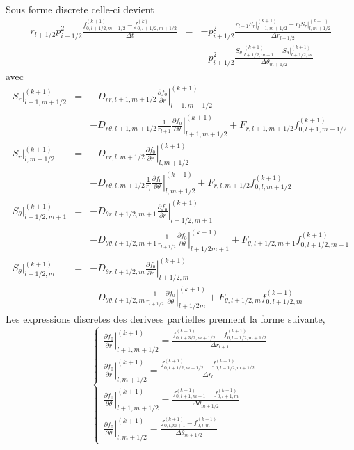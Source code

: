 Sous forme discrete celle-ci devient \begin{eqnarray*}
r_{l+1/2}p_{i+1/2}^{2}\frac{f_{0,l+1/2,m+1/2}^{(k+1)}-f_{0,l+1/2,m+1/2}^{(k)}}{\Delta t} & = & -p_{i+1/2}^{2}\frac{r_{l+1}\left.S_{r}\right|_{l+1,m+1/2}^{(k+1)}-r_{l}\left.S_{r}\right|_{l,m+1/2}^{(k+1)}}{\Delta r_{l+1/2}}\\
 &  & -p_{i+1/2}^{2}\frac{\left.S_{\theta}\right|_{l+1/2,m+1}^{(k+1)}-\left.S_{\theta}\right|_{l+1/2,m}^{(k+1)}}{\Delta\theta_{m+1/2}}\end{eqnarray*}
 avec \begin{eqnarray*}
\left.S_{r}\right|_{l+1,m+1/2}^{(k+1)} & = & -D_{rr,l+1,m+1/2}\left.\frac{\partial f_{0}}{\partial r}\right|_{l+1,m+1/2}^{(k+1)}\\
 &  & -D_{r\theta,l+1,m+1/2}\frac{1}{r_{l+1}}\left.\frac{\partial f_{0}}{\partial\theta}\right|_{l+1,m+1/2}^{(k+1)}+F_{r,l+1,m+1/2}f_{0,l+1,m+1/2}^{(k+1)}\\
\left.S_{r}\right|_{l,m+1/2}^{(k+1)} & = & -D_{rr,l,m+1/2}\left.\frac{\partial f_{0}}{\partial r}\right|_{l,m+1/2}^{(k+1)}\\
 &  & -D_{r\theta,l,m+1/2}\frac{1}{r_{l}}\left.\frac{\partial f_{0}}{\partial\theta}\right|_{l,m+1/2}^{(k+1)}+F_{r,l,m+1/2}f_{0,l,m+1/2}^{(k+1)}\\
\left.S_{\theta}\right|_{l+1/2,m+1}^{(k+1)} & = & -D_{\theta r,l+1/2,m+1}\left.\frac{\partial f_{0}}{\partial r}\right|_{l+1/2,m+1}^{(k+1)}\\
 &  & -D_{\theta\theta,l+1/2,m+1}\frac{1}{r_{l+1/2}}\left.\frac{\partial f_{0}}{\partial\theta}\right|_{l+1/2m+1}^{(k+1)}+F_{\theta,l+1/2,m+1}f_{0,l+1/2,m+1}^{(k+1)}\\
\left.S_{\theta}\right|_{l+1/2,m}^{(k+1)} & = & -D_{\theta r,l+1/2,m}\left.\frac{\partial f_{0}}{\partial r}\right|_{l+1/2,m}^{(k+1)}\\
 &  & -D_{\theta\theta,l+1/2,m}\frac{1}{r_{l+1/2}}\left.\frac{\partial f_{0}}{\partial\theta}\right|_{l+1/2m}^{(k+1)}+F_{\theta,l+1/2,m}f_{0,l+1/2,m}^{(k+1)}\end{eqnarray*}
 Les expressions discretes des derivees partielles prennent la forme
suivante, \[
\left\{ \begin{array}{l}
\left.\frac{\partial f_{0}}{\partial r}\right|_{l+1,m+1/2}^{(k+1)}=\frac{f_{0,l+3/2,m+1/2}^{(k+1)}-f_{0,l+1/2,m+1/2}^{(k+1)}}{\Delta r_{l+1}}\\
\left.\frac{\partial f_{0}}{\partial r}\right|_{l,m+1/2}^{(k+1)}=\frac{f_{0,l+1/2,m+1/2}^{(k+1)}-f_{0,l-1/2,m+1/2}^{(k+1)}}{\Delta r_{l}}\\
\left.\frac{\partial f_{0}}{\partial\theta}\right|_{l+1,m+1/2}^{(k+1)}=\frac{f_{0,l+1,m+1}^{(k+1)}-f_{0,l+1,m}^{(k+1)}}{\Delta\theta_{m+1/2}}\\
\left.\frac{\partial f_{0}}{\partial\theta}\right|_{l,m+1/2}^{(k+1)}=\frac{f_{0,l,m+1}^{(k+1)}-f_{0,l,m}^{(k+1)}}{\Delta\theta_{m+1/2}}\end{array}\right.\]
